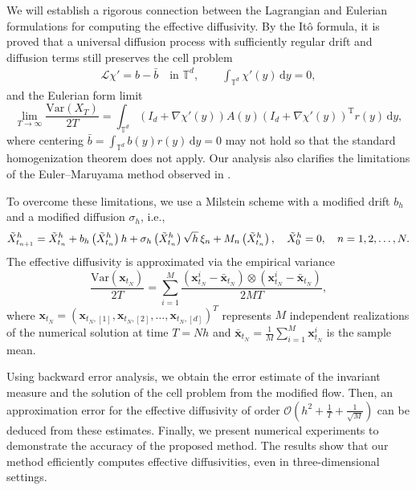 \documentclass[12pt,a4paper,reqno]{amsart}
\newcommand{\T}{\mathbb{T}}
\numberwithin{equation}{section}
\begin{document}
We will establish a rigorous connection between the Lagrangian and Eulerian formulations for computing the effective diffusivity. By the It\^{o} formula, it is proved that a universal diffusion process with sufficiently regular drift and diffusion terms still preserves the cell problem
\begin{align*}
    \mathcal{L}\chi' = b - \bar{b}\quad\text{in }\mathbb{T}^d, \qquad \int_{\mathbb{T}^d}\chi'(y)\, \mathrm{d}y = 0,
\end{align*}
and the Eulerian form limit
 \begin{equation*}
    \lim_{T\to \infty}\frac{\mathrm{Var}(X_T)}{2T}  =\int_{\T^d} \left(I_d + \nabla \chi'(y)\right)A(y)\left(I_d+\nabla \chi'(y)\right)^{\mathrm{T}}r(y)\,\mathrm{d}y,
\end{equation*}
where centering $\bar{b}=\int_{\mathbb{T}^d}b(y)r(y)\,\mathrm{d}y = 0$ may not hold so that the standard homogenization theorem does not apply. Our analysis also clarifies the limitations of the Euler--Maruyama method observed in \cite{PSZ09,WXZ18,WXZ21}.

To overcome these limitations, we use a Milstein scheme with a modified drift $b_h$ and a modified diffusion $\sigma_h$, i.e.,
\begin{equation*}
	\Tilde{X}_{t_{n+1}}^h = \Tilde{X}_{t_{n}}^h + b_{h}\left(\Tilde{X}_{t_{n}}^h\right)h + \sigma_{h}\left(\Tilde{X}_{t_n}^h\right)\sqrt{h}\,\xi_n + M_n\left(\Tilde{X}_{t_n}^h\right),\quad \tilde{X}_{0}^h = 0,\quad n= 1,2,\dotsc,N.
\end{equation*}
 The effective diffusivity is approximated via the empirical variance
 \begin{equation*}
 	\frac{\mathrm{Var}(\bm x_{t_N})}{2T} = \sum_{i=1}^M\frac{(\bm x^i_{t_N} -  \bar{\bm x}_{t_N})\otimes(\bm x^i_{t_N} - \bar{\bm x}_{t_N})}{2MT},
\end{equation*}
where $\bm x_{t_N} =  \left(\bm x_{t_N,[1]},\bm x_{t_N,[2]},\dotsc, \bm x_{t_N,[d]}\right)^T $ represents $M$ independent realizations of the numerical solution at time $T=Nh$ and $\bar{\bm x}_{t_N} = \frac{1}{M}\sum_{i=1}^M\bm x^i_{t_N}$ is the sample mean.  

Using backward error analysis, we obtain the error estimate of the invariant measure and the solution of the cell problem from the modified flow. Then, an approximation error for the effective diffusivity of order $\mathcal{O}\left(h^2 +\frac{1}{T} +\frac{1}{\sqrt{M}}\right)$ can be deduced from these estimates. Finally, we present numerical experiments to demonstrate the accuracy of the proposed method. The results show that our method efficiently computes effective diffusivities, even in three-dimensional settings. 
 
\end{document}
